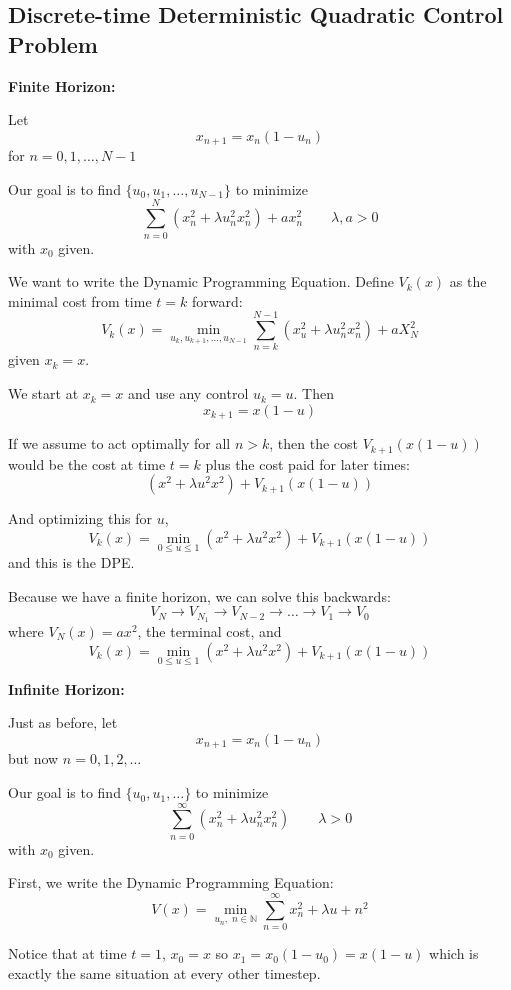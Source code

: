 \documentclass[12pt]{report}
\newcommand{\N}{\mathbb{N}}
\begin{document}
    \subsection*{Discrete-time Deterministic Quadratic Control Problem}

    \textbf{Finite Horizon:}

    Let
    \[x_{n+1} = x_n(1 - u_n)\]
    for $n = 0, 1, \dots, N - 1$

    Our goal is to find $\{u_0, u_1, \dots, u_{N-1}\}$ to minimize 
    \[\sum_{n=0}^{N} (x_n^2 + \lambda u_n^2 x_n^2) + ax_n^2 \qquad \lambda, a > 0\]
    with $x_0$ given. 

    We want to write the Dynamic Programming Equation. Define $V_k(x)$ as the minimal cost from time $t= k$ forward:
    \[V_k(x) = \min_{u_k, u_{k+1}, \dots, u_{N-1}} \sum_{n=k}^{N-1} (x_u^2 + \lambda u_n^2 x_n^2) + a X_N^2\]
    given $x_k = x$.  
    
    We start at $x_k = x$ and use any control $u_k = u$. Then 
    \[x_{k+1} = x(1 - u)\]

    If we assume to act optimally for all $n > k$, then the cost $V_{k+1}(x(1 - u))$
    would be the cost at time $t = k$ plus the cost paid for later times: 
    \[(x^2 + \lambda u^2 x^2) + V_{k+1}(x(1 - u))\]

    And optimizing this for $u$, 
    \[V_k(x) = \min_{0 \leq u \leq 1} (x^2 + \lambda u^2 x^2) + V_{k+1}(x(1 - u))\]
    and this is the DPE. 

    Because we have a finite horizon, we can solve this backwards: 
    \[V_N \to V_{N_1} \to V_{N-2} \to \dots \to V_1 \to V_0\]
    where $V_N(x) =ax^2$, the terminal cost, and 
    \[V_k(x) = \min_{0 \leq u \leq 1} (x^2 + \lambda u^2 x^2) + V_{k+1}(x(1 - u))\]
    
    \textbf{Infinite Horizon:}
    
        Just as before, let 
        \[x_{n+1} = x_n (1 - u_n)\]
        but now $n = 0, 1, 2, \dots$ 
        
        Our goal is to find $\{u_0, u_1, \dots\}$ to minimize 
        \[\sum_{n=0}^{\infty} (x_n^2 + \lambda u_n^2 x_n^2) \qquad \lambda > 0\]
        with $x_0$ given.

        First, we write the Dynamic Programming Equation:
        \[V(x) = \min_{u_n,\; n\in \N} \sum_{n=0}^\infty x_n^2 + \lambda u+n^2\]

        Notice that at time $t = 1$, $x_0 = x$ so $x_1 = x_0(1 - u_0) = x(1 - u)$ which is exactly the same situation at every other timestep. 
\end{document}
